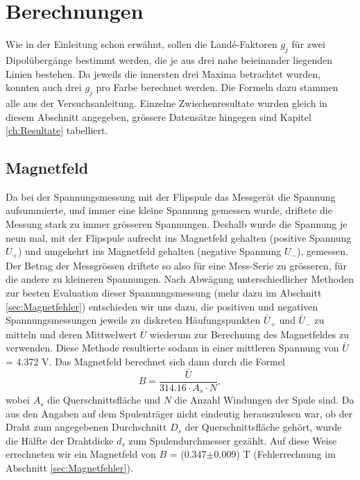 \documentclass[a4paper,parskip,11pt, DIV12]{scrreprt}
\begin{document}
	
	\chapter{Berechnungen}
	\label{ch:Berechnungen}
	
	Wie in der Einleitung schon erwähnt, sollen die Landé-Faktoren $g_j$ für zwei Dipolübergänge bestimmt werden, die je aus drei nahe beieinander liegenden Linien bestehen. Da jeweils die innersten drei Maxima betrachtet wurden, konnten auch drei $g_j$ pro Farbe berechnet werden. Die Formeln dazu stammen alle aus der Versuchsanleitung. Einzelne Zwischenresultate wurden gleich in diesem Abschnitt angegeben, grössere Datensätze hingegen sind Kapitel \ref{ch:Resultate} tabelliert.
	
	\section{Magnetfeld}
	
	Da bei der Spannungsmessung mit der Flipspule das Messgerät die Spannung aufsummierte, und immer eine kleine Spannung gemessen wurde, driftete die Messung stark zu immer grösseren Spannungen. Deshalb wurde die Spannung je neun mal, mit der Flipspule aufrecht ins Magnetfeld gehalten (positive Spannung $U_+$) und umgekehrt ins Magnetfeld gehalten (negative Spannung $U_-$), gemessen. Der Betrag der Messgrössen driftete so also für eine Mess-Serie zu grösseren, für die andere zu kleineren Spannungen. Nach Abwägung unterschiedlicher Methoden zur besten Evaluation dieser Spannungsmessung (mehr dazu im Abschnitt \ref{sec:Magnetfehler}) entschieden wir uns dazu, die positiven und negativen Spannungsmessungen jeweils zu diskreten Häufungspunkten $\bar{U}_+$ und $\bar{U}_-$ zu mitteln und deren Mittwelwert $\bar{U}$ wiederum zur Berechnung des Magnetfeldes zu verwenden. Diese Methode resultierte sodann in einer mittleren Spannung von $\bar{U}$ = 4.372 V.
	Das Magnetfeld berechnet sich dann durch die Formel
	\begin{equation}
	\label{B-Feld}
	B = \frac{\bar{U}}{314.16 \cdot A_s \cdot N} ,
	\end{equation}
	wobei $A_s$ die Querschnittsfläche und $N$ die Anzahl Windungen der Spule sind. Da aus den Angaben auf dem Spulenträger nicht eindeutig herauszulesen war, ob der Draht zum angegebenen Durchschnitt $D_s$ der Querschnittsfläche gehört, wurde die Hälfte der Drahtdicke $d_s$ zum Spulendurchmesser gezählt. Auf diese Weise errechneten wir ein Magnetfeld von $B$ = (0.347$\pm$0.009) T (Fehlerrechnung im Abschnitt \ref{sec:Magnetfehler}).
	
\end{document}

